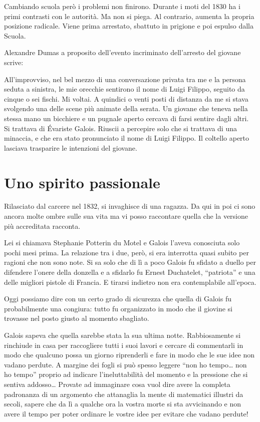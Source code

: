 Cambiando scuola però i problemi non finirono. Durante i moti del 1830 ha i primi contrasti con le autorità. Ma non si piega. Al contrario, aumenta la propria posizione radicale. Viene prima arrestato, sbattuto in prigione e poi espulso dalla Scuola.

Alexandre Dumas a proposito dell’evento incriminato dell’arresto del giovane scrive:

All’improvviso, nel bel mezzo di una conversazione privata tra me e la persona seduta a sinistra, le mie orecchie sentirono il nome di Luigi Filippo, seguito da cinque o sei fischi. Mi voltai. A quindici o venti posti di distanza da me si stava svolgendo una delle scene più animate della serata. Un giovane che teneva nella stessa mano un bicchiere e un pugnale aperto cercava di farsi sentire dagli altri.
Si trattava di Évariste Galois. Riuscii a percepire solo che si trattava di una minaccia, e che era stato pronunciato il nome di Luigi Filippo. Il coltello aperto lasciava trasparire le intenzioni del giovane.

\section{Uno spirito passionale}

Rilasciato dal carcere nel 1832, si invaghisce di una ragazza. Da qui in poi ci sono ancora molte ombre sulle sua vita ma vi posso raccontare quella che la versione più accreditata racconta.

Lei si chiamava Stephanie Potterin du Motel e Galois l’aveva conosciuta solo pochi mesi prima. La relazione tra i due, però, si era interrotta quasi subito per ragioni che non sono note. Si sa solo che di lì a poco Galois fu sfidato a duello per difendere l’onere della donzella e a sfidarlo fu Ernest Duchatelet, “patriota” e una delle migliori pistole di Francia. E tirarsi indietro non era contemplabile all’epoca.

Oggi possiamo dire con un certo grado di sicurezza che quella di Galois fu probabilmente una congiura: tutto fu organizzato in modo che il giovine si trovasse nel posto giusto al momento sbagliato.

Galois sapeva che quella sarebbe stata la sua ultima notte. Rabbiosamente si rinchiude in casa per raccogliere tutti i suoi lavori e cercare di commentarli in modo che qualcuno possa un giorno riprenderli e fare in modo che le sue idee non vadano perdute. A margine dei fogli si può spesso leggere “non ho tempo… non ho tempo” proprio ad indicare l’ineluttabilità del momento e la pressione che si sentiva addosso… Provate ad immaginare cosa vuol dire avere la completa padronanza di un argomento che attanaglia la mente di matematici illustri da secoli, sapere che da lì a qualche ora la vostra morte si sta avvicinando e non avere il tempo per poter ordinare le vostre idee per evitare che vadano perdute!

